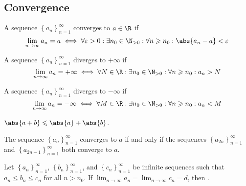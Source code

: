 \documentclass{article}
\begin{document}
\subsection{Convergence}
\begin{theorem}
    A sequence $\left\{a_n\right\}_{n=1}^\infty$ converges to $a\in \R$ if
    \begin{equation*}
        \lim_{n \to \infty}a_n = a \iff \forall \varepsilon > 0 : \exists n_0 \in \N_{> 0}:\forall n \geqslant n_0 : \abs{a_n - a} < \varepsilon
    \end{equation*}
\end{theorem}
%
\begin{theorem}
    A sequence $\left\{a_n\right\}_{n=1}^\infty$ diverges to $+\infty$ if
    \begin{equation*}
        \lim_{n \to \infty}a_n = +\infty \iff \forall N \in \R : \exists n_0 \in \N_{> 0}:\forall n \geqslant n_0 : a_n > N
    \end{equation*}
\end{theorem}
%
\begin{theorem}
    A sequence $\left\{a_n\right\}_{n=1}^\infty$ diverges to $-\infty$ if
    \begin{equation*}
        \lim_{n \to \infty}a_n = -\infty \iff \forall M \in \R : \exists n_0 \in \N_{> 0}:\forall n \geqslant n_0 : a_n < M
    \end{equation*}
\end{theorem}
%
\begin{theorem}
    $\abs{a+b}\leqslant\abs{a}+\abs{b}$.
\end{theorem}
%
\begin{theorem}
    The sequence $\left\{ a_n \right\}_{n=1}^\infty$ converges to $a$ if and only if the sequences $\left\{ a_{2n} \right\}_{n=1}^\infty$ and $\left\{ a_{2n-1} \right\}_{n=1}^\infty$ both converge to $a$.
\end{theorem}
%
\begin{theorem}
    Let $\left\{ a_n \right\}_{n=1}^\infty$, $\left\{ b_n \right\}_{n=1}^\infty$, and $\left\{ c_n \right\}_{n=1}^\infty$ be infinite sequences such that $a_n \leqslant b_n \leqslant c_n$ for all $n>n_0$. If $\lim_{n\to\infty}a_n=\lim_{n\to\infty}c_n=d$, then .
\end{theorem}
%
\end{document}
